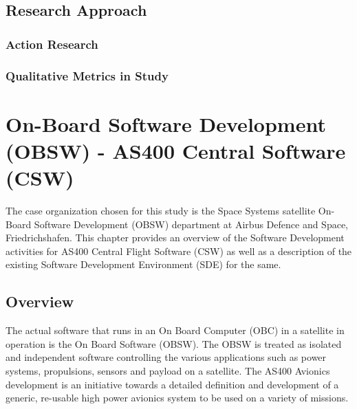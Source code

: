 \documentclass[12pt, a4paper, titlepage]{scrartcl}
\begin{document}
\subsection{Research Approach}
\subsubsection{Action Research}
\subsubsection{Qualitative Metrics in Study}


\section{On-Board Software Development (OBSW) - AS400 Central Software (CSW)}
The case organization chosen for this study is the Space Systems satellite On-Board Software Development (OBSW) department at Airbus Defence and Space, Friedrichshafen. This chapter provides an overview of the Software Development activities for AS400 Central Flight Software (CSW) as well as a description of the existing Software Development Environment (SDE) for the same.
\subsection{Overview}
The actual software that runs in an On Board Computer (OBC) in a satellite in operation is the On Board Software (OBSW). The OBSW is treated as isolated and independent software controlling the various applications such as power systems, propulsions, sensors and payload on a satellite. The AS400 Avionics development is an initiative towards a detailed definition and development of a generic, re-usable high power avionics system to be used on a variety of missions. 
\end{document}
